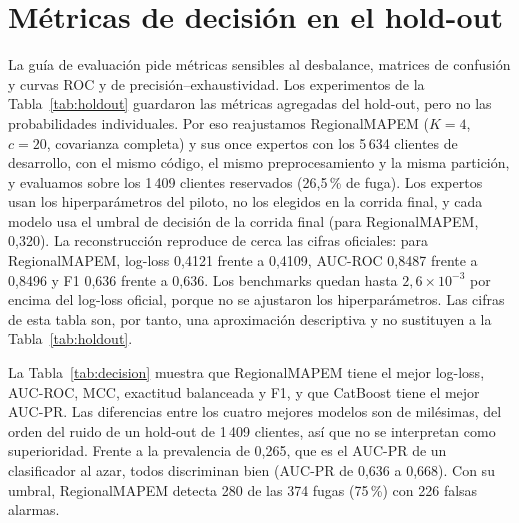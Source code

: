 \documentclass[11pt,a4paper]{article}
\begin{document}
\section{Métricas de decisión en el hold-out}\label{app:decision}
La guía de evaluación pide métricas sensibles al desbalance, matrices de confusión y curvas ROC y de precisión--exhaustividad. Los experimentos de la Tabla~\ref{tab:holdout} guardaron las métricas agregadas del hold-out, pero no las probabilidades individuales. Por eso reajustamos RegionalMAPEM ($K=4$, $c=20$, covarianza completa) y sus once expertos con los 5\,634 clientes de desarrollo, con el mismo código, el mismo preprocesamiento y la misma partición, y evaluamos sobre los 1\,409 clientes reservados (26,5\,\% de fuga). Los expertos usan los hiperparámetros del piloto, no los elegidos en la corrida final, y cada modelo usa el umbral de decisión de la corrida final (para RegionalMAPEM, 0,320). La reconstrucción reproduce de cerca las cifras oficiales: para RegionalMAPEM, log-loss 0,4121 frente a 0,4109, AUC-ROC 0,8487 frente a 0,8496 y F1 0,636 frente a 0,636. Los benchmarks quedan hasta $2{,}6\times10^{-3}$ por encima del log-loss oficial, porque no se ajustaron los hiperparámetros. Las cifras de esta tabla son, por tanto, una aproximación descriptiva y no sustituyen a la Tabla~\ref{tab:holdout}.

La Tabla~\ref{tab:decision} muestra que RegionalMAPEM tiene el mejor log-loss, AUC-ROC, MCC, exactitud balanceada y F1, y que CatBoost tiene el mejor AUC-PR. Las diferencias entre los cuatro mejores modelos son de milésimas, del orden del ruido de un hold-out de 1\,409 clientes, así que no se interpretan como superioridad. Frente a la prevalencia de 0,265, que es el AUC-PR de un clasificador al azar, todos discriminan bien (AUC-PR de 0,636 a 0,668). Con su umbral, RegionalMAPEM detecta 280 de las 374 fugas (75\,\%) con 226 falsas alarmas.
\end{document}
